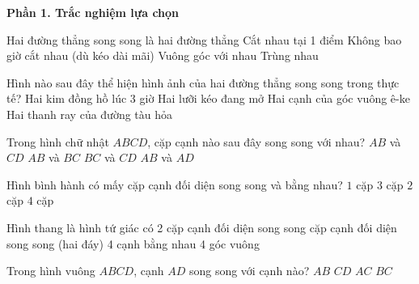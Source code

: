 \textbf{Phần 1. Trắc nghiệm lựa chọn}

\begin{ex} %
Hai đường thẳng song song là hai đường thẳng
\choice
{Cắt nhau tại 1 điểm}
{\True Không bao giờ cắt nhau (dù kéo dài mãi)}
{Vuông góc với nhau}
{Trùng nhau}
\end{ex}

\begin{ex} %
Hình nào sau đây thể hiện hình ảnh của hai đường thẳng song song trong thực tế?
\choice
{Hai kim đồng hồ lúc 3 giờ}
{Hai lưỡi kéo đang mở}
{Hai cạnh của góc vuông ê-ke}
{\True Hai thanh ray của đường tàu hỏa}
\end{ex}

\begin{ex} %
Trong hình chữ nhật $ABCD$, cặp cạnh nào sau đây song song với nhau?
\choice
{\True $AB$ và $CD$}
{$AB$ và $BC$}
{$BC$ và $CD$}
{$AB$ và $AD$}
\end{ex}

\begin{ex} %
Hình bình hành có mấy cặp cạnh đối diện song song và bằng nhau?
\choice
{$1$ cặp}
{$3$ cặp}
{\True $2$ cặp}
{$4$ cặp}
\end{ex}

\begin{ex} %
Hình thang là hình tứ giác có
\choice
{2 cặp cạnh đối diện song song}
{ cặp cạnh đối diện song song (hai đáy)}
{4 cạnh bằng nhau}
{4 góc vuông}
\end{ex}

\begin{ex} %
Trong hình vuông $ABCD$, cạnh $AD$ song song với cạnh nào?
\choice
{$AB$}
{$CD$}
{$AC$}
{\True $BC$}
\end{ex}

